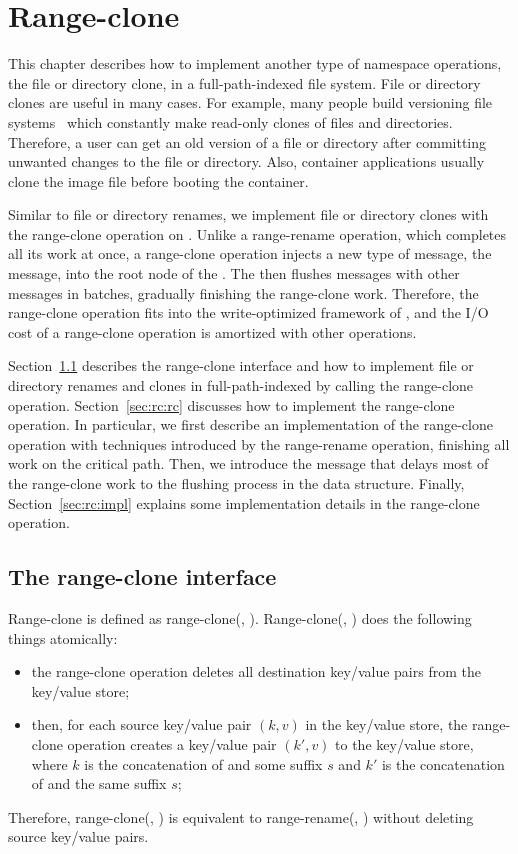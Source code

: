 \chapter{Range-clone}
\label{chap:clone}

This chapter describes how to implement another type of namespace operations,
the file or directory clone, in a full-path-indexed file system.
File or directory clones are useful in many cases.
For example,
many people build versioning file systems~\citep{efs, cvfs, versionfs}
which constantly make read-only clones of files and directories.
Therefore, a user can get an old version of a file or directory after committing
unwanted changes to the file or directory.
Also, container applications usually clone the image file
before booting the container.

Similar to file or directory renames,
we implement file or directory clones with the range-clone operation on \bets.
Unlike a range-rename operation, which completes all its work at once,
a range-clone operation injects a new type of message, the \goto message,
into the root node of the \bet.
The \bet then flushes \goto messages with other messages in batches, gradually
finishing the range-clone work.
Therefore,
the range-clone operation fits into the write-optimized framework of \bets,
and the I/O cost of a range-clone operation is amortized with other operations.

Section~\ref{sec:rc:int} describes the range-clone interface and how to implement
file or directory renames and clones in full-path-indexed \betrfs by calling the
range-clone operation.
Section~\ref{sec:rc:rc} discusses how to implement the range-clone operation.
In particular, we first describe an implementation of the range-clone operation
with techniques introduced by the range-rename operation,
finishing all work on the critical path.
Then, we introduce the \goto message that delays most of the range-clone work
to the flushing process in the data structure.
Finally, Section~\ref{sec:rc:impl} explains some implementation details in the
range-clone operation.

\section{The range-clone interface}
\label{sec:rc:int}

Range-clone is defined as range-clone(\spre, \dpre).
Range-clone(\spre, \dpre) does the following things atomically:
\begin{itemize}
\item the range-clone operation deletes all destination key/value pairs from
    the key/value store;
\item then, for each source key/value pair $(k,v)$ in the key/value store,
    the range-clone operation creates a key/value pair $(k',v)$ to the
    key/value store, where $k$ is the concatenation of \spre and some suffix
    $s$ and $k'$ is the concatenation of \dpre and the same suffix $s$;
\end{itemize}
Therefore, range-clone(\spre, \dpre) is equivalent to range-rename(\spre, \dpre)
without deleting source key/value pairs.

